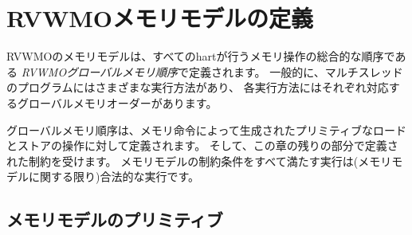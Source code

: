 \begin{comment}
\section{Definition of the RVWMO Memory Model}
\end{comment}
\section{RVWMOメモリモデルの定義}
\label{sec:rvwmo}

\begin{comment}
The RVWMO memory model is defined in terms of the {\em global memory order}, a total ordering of the memory operations produced by all harts.
In general, a multithreaded program has many different possible executions, with each execution having its own corresponding global memory order.
\end{comment}

RVWMOのメモリモデルは、すべてのhartが行うメモリ操作の総合的な順序である
{\em RVWMOグローバルメモリ順序}で定義されます。
一般的に、マルチスレッドのプログラムにはさまざまな実行方法があり、
各実行方法にはそれぞれ対応するグローバルメモリオーダーがあります。


\begin{comment}
The global memory order is defined over the primitive load and store operations generated by memory instructions.
It is then subject to the constraints defined in the rest of this chapter.
Any execution satisfying all of the memory model constraints is a legal execution (as far as the memory model is concerned).
\end{comment}

グローバルメモリ順序は、メモリ命令によって生成されたプリミティブなロードとストアの操作に対して定義されます。
そして、この章の残りの部分で定義された制約を受けます。
メモリモデルの制約条件をすべて満たす実行は(メモリモデルに関する限り)合法的な実行です。


\begin{comment}
\subsection*{Memory Model Primitives}
\end{comment}
\subsection*{メモリモデルのプリミティブ}

